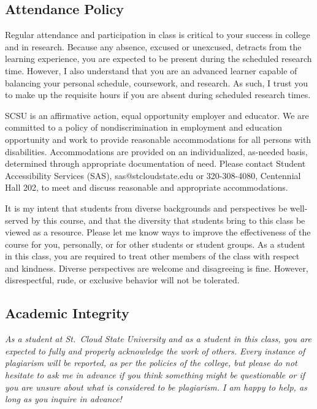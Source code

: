 \documentclass{tufte-handout}
\begin{document}
\begin{fullwidth}

\subsection{Attendance Policy}

Regular attendance and participation in class is critical to your success in college and in research. Because any absence, excused or unexcused, detracts from the learning experience, you are expected to be present during the scheduled research time. However, I also understand that you are an advanced learner capable of balancing your personal schedule, coursework, and research. As such, I trust you to make up the requisite hours if you are absent during scheduled research times. 


 SCSU is an affirmative action, equal opportunity employer and educator. We are committed to a policy of nondiscrimination in employment and education opportunity and work to provide reasonable accommodations for all persons with disabilities. Accommodations are provided on an individualized, as-needed basis, determined through appropriate documentation of need. Please contact Student Accessibility Services (SAS), sas@stcloudstate.edu or 320-308-4080, Centennial Hall 202, to meet and discuss reasonable and appropriate accommodations. 

 It is my intent that students from diverse backgrounds and perspectives be well-served by this course, and that the diversity that students bring to this class be viewed as a resource. Please let me know ways to improve the effectiveness of the course for you, personally, or for other students or student groups. As a student in this class, you are required to treat other members of the class with respect and kindness. Diverse perspectives are welcome and disagreeing is fine. However, disrespectful, rude, or exclusive behavior will not be tolerated.





\subsection{Academic Integrity}



\emph{As a student at St.\ Cloud State University and as a student in this class, you are expected to fully and properly acknowledge the work of others. Every instance of plagiarism will be reported, as per the policies of the college, but please do not hesitate to ask me in advance if you think something might be questionable or if you are unsure about what is considered to be plagiarism. I am happy to help, as long as you inquire in advance! }


\end{fullwidth}
\end{document}
